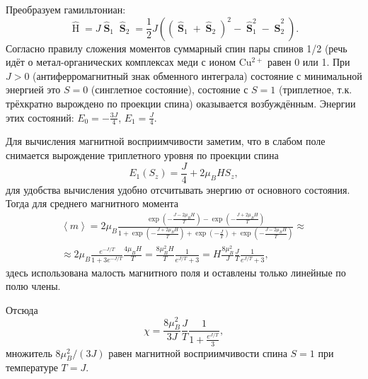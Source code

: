 \documentclass[a4paper]{article}
\begin{document}
\begin{sol}
Преобразуем гамильтониан:
\[
	\widehat{\operatorname{H}}= J \widehat{\operatorname{\mathbf{S}}}_1 \widehat{\operatorname{\mathbf{S}}}_2=
	\frac{1}{2}J\left( 
	\left( \widehat{\operatorname{\mathbf{S}}}_1+
\widehat{\operatorname{\mathbf{S}}}_2\right) ^2- 
\widehat{\operatorname{\mathbf{S}}}_1^2-
\widehat{\operatorname{\mathbf{S}}}_2^2\right) 
.\] 
Согласно правилу сложения моментов суммарный спин
пары спинов 1/2 (речь идёт о метал-органических
комплексах меди с ионом Cu$^{2+}$ равен 0 или 1.
При $J>0$ (антиферромагнитный знак обменного интеграла)
состояние с минимальной энергией это $S=0$ 
(синглетное состояние), состояние с $S=1$ 
(триплетное, т.\:к. трёхкратно вырождено по
проекции спина) оказывается возбуждённым. Энергии
этих состояний: $E_0= - \frac{3J}{4}$, $E_1= \frac{J}{4}$. 

Для вычисления магнитной восприимчивости заметим,
что в слабом поле снимается вырождение триплетного
уровня по проекции спина
\[
	E_1(S_z)= \frac{J}{4}+2 \mu_B H S_z
,\]
для удобства вычисления удобно отсчитывать энергию
от основного состояния. Тогда для среднего
магнитного момента
\begin{multline*}
	\left<m \right> = 2\mu_B \frac{\exp \left(- \frac{J-2\mu_B H
	}{T}\right)-\exp \left(- \frac{J+2\mu_B H}{T}\right)}{1+ \exp \left( 
	- \frac{J+ 2\mu_B H}{T}\right) +
\exp \left( -\frac{J}{T} \right) +
\exp  \left( - \frac{J-2\mu_B H}{T} \right) }
\approx\\ \approx
2\mu_B \frac{e^{-J /T}}{1+ 3 e^{- J /T}}\frac{4\mu_B H}{T}= \frac{8 \mu_B ^2 H}{T} \frac{1}{e^{J /T}+3}
=H \frac{8\mu_B^2}{J} \frac{J}{T} \frac{1}{e^{J /T}+3}
,\end{multline*} 
здесь использована малость магнитного поля и оставлены
только линейные по полю члены.

Отсюда 
\[
\chi= \frac{8 \mu_B^2}{3J} \frac{J}{T} \frac{1}{
1+\frac{e^{J /T}}{3}}
,\] 
множитель $8\mu_B^2 /(3J)$ равен
магнитной восприимчивости спина $S=1$ при температуре
$T=J$.


\end{sol}
\end{document}
